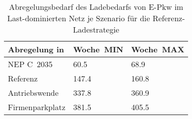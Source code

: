 {
\renewcommand{\arraystretch}{1.2}%
\begin{table}[H]
	\begin{center}
		\caption{Abregelungsbedarf des Ladebedarfs von E-Pkw im Last-dominierten Netz je Szenario für die Referenz-Ladestrategie}
		\begin{tabu} to 0.6\textwidth {X[1.5] X[1, r] X[1, r]}
			\toprule
			Abregelung in   \si{\mwh}    & Woche~MIN     & Woche~MAX     \\ \midrule
			NEP C~\num{2035}             & \num{60.5}  & \num{68.9}  \\
			Referenz                     & \num{147.4} & \num{160.8} \\
			Antriebswende                & \num{337.8} & \num{360.9} \\
			\glqq Firmenparkplatz\grqq{} & \num{381.5} & \num{405.5} \\ \bottomrule
		\end{tabu}
		\label{tab:load_dominated_epkw_cur}
	\end{center}
	\vspace{-3mm}%
\end{table}
}